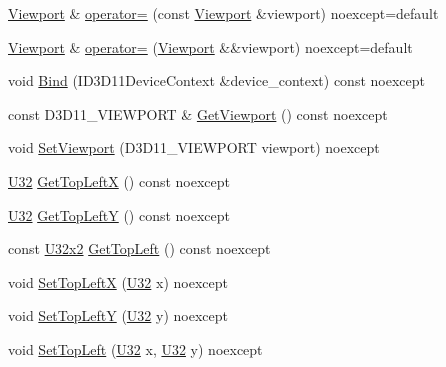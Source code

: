 \begin{DoxyCompactItemize}
\item 
\hyperlink{classmage_1_1rendering_1_1_viewport}{Viewport} \& \hyperlink{classmage_1_1rendering_1_1_viewport_afc42613270537b92aa837455b4c154f0}{operator=} (const \hyperlink{classmage_1_1rendering_1_1_viewport}{Viewport} \&viewport) noexcept=default
\item 
\hyperlink{classmage_1_1rendering_1_1_viewport}{Viewport} \& \hyperlink{classmage_1_1rendering_1_1_viewport_a62b0439861e78c3718f2b29339ec7226}{operator=} (\hyperlink{classmage_1_1rendering_1_1_viewport}{Viewport} \&\&viewport) noexcept=default
\item 
void \hyperlink{classmage_1_1rendering_1_1_viewport_a8aeb392ce46ab413d607cdea36033e21}{Bind} (I\+D3\+D11\+Device\+Context \&device\+\_\+context) const noexcept
\item 
const D3\+D11\+\_\+\+V\+I\+E\+W\+P\+O\+RT \& \hyperlink{classmage_1_1rendering_1_1_viewport_a9b931e5491d44459f598868eee59f1cc}{Get\+Viewport} () const noexcept
\item 
void \hyperlink{classmage_1_1rendering_1_1_viewport_a641dc22ff2ea12c7f3164b704e9ea479}{Set\+Viewport} (D3\+D11\+\_\+\+V\+I\+E\+W\+P\+O\+RT viewport) noexcept
\item 
\hyperlink{namespacemage_a41c104c036fba3756a74e19f793eeaa1}{U32} \hyperlink{classmage_1_1rendering_1_1_viewport_aaaf7eb2b56b5f325c6bd56ea31b19d45}{Get\+Top\+LeftX} () const noexcept
\item 
\hyperlink{namespacemage_a41c104c036fba3756a74e19f793eeaa1}{U32} \hyperlink{classmage_1_1rendering_1_1_viewport_a78207536cbba1fbfa82160eb7672ec02}{Get\+Top\+LeftY} () const noexcept
\item 
const \hyperlink{namespacemage_a88e05bff0300120c013285d3dcad95c5}{U32x2} \hyperlink{classmage_1_1rendering_1_1_viewport_ad87e35df4d1f9ff3208d82c9af565b4d}{Get\+Top\+Left} () const noexcept
\item 
void \hyperlink{classmage_1_1rendering_1_1_viewport_a6f7a3cdf08fd05382d18452300d69205}{Set\+Top\+LeftX} (\hyperlink{namespacemage_a41c104c036fba3756a74e19f793eeaa1}{U32} x) noexcept
\item 
void \hyperlink{classmage_1_1rendering_1_1_viewport_a826829c187f60fbc203f382c6f70ec61}{Set\+Top\+LeftY} (\hyperlink{namespacemage_a41c104c036fba3756a74e19f793eeaa1}{U32} y) noexcept
\item 
void \hyperlink{classmage_1_1rendering_1_1_viewport_a281e2fdd022aa9714741f5291be1c6ef}{Set\+Top\+Left} (\hyperlink{namespacemage_a41c104c036fba3756a74e19f793eeaa1}{U32} x, \hyperlink{namespacemage_a41c104c036fba3756a74e19f793eeaa1}{U32} y) noexcept

\end{DoxyCompactItemize}
